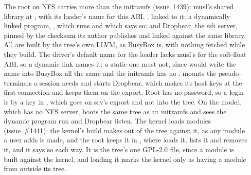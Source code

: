 \documentclass[journal,onecolumn,9pt]{IEEEtran}
\begin{document}
The root on NFS carries more than the initramfs (issue~1439): musl's
shared library at , with its loader's name for this
ABI, , linked to it; a dynamically
linked program, , which  runs and which
says so; and Dropbear, the ssh server, pinned by the checksum its author
publishes and linked against the same library. All are built by the
tree's own LLVM, as BusyBox is, with nothing fetched while they build.
The driver's default name for the loader lacks musl's  for
the soft-float ABI, so a dynamic link names it; a static one must not,
since  would write the name into BusyBox all the same and
the initramfs has no .  mounts the
pseudo-terminals a session needs and starts Dropbear, which makes its
host keys at the first connection and keeps them on the export. Root
has no password, so a login is by a key in
, which goes on srv's export and
not into the tree. On the model, which has no NFS server,
 boots the same tree as an initramfs and sees
the dynamic program run and Dropbear listen.
The kernel loads modules (issue~\#1441): the kernel's build makes
 out of the tree against it, as any module a
user adds is made, and the root keeps it in , where
 loads it, lists it and removes it, and it says so each
way. It is the tree's one GPL-2.0 file, since a module is built against
the kernel, and loading it marks the kernel only as having a module
from outside its tree.
\end{document}
